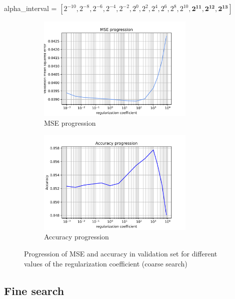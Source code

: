 \documentclass[a4paper]{article}    %
\begin{document}
\begin{center}
    alpha\_interval = $[2^{-10}, 2^{-8}, 2^{-6}, 2^{-4}, 2^{-2}, 2^{0}, 2^{2}, 2^{4}, 2^{6}, 2^{8}, 2^{10}, \boldsymbol{2^{11}, 2^{12}, 2^{13}}]$
\end{center}

\begin{figure}[H]
    \centering
    \begin{subfigure}{0.48\textwidth}
        \centering
        \includegraphics[width=7.5cm]{alpha_MSE_coarse_search}
        \caption{MSE progression}
        \label{fig:alpha-coarse-mse}
    \end{subfigure}
    \hfill
    \begin{subfigure}{0.48\textwidth}
        \centering
        \includegraphics[width=7.5cm]{alpha_ACCURACY_coarse_search}
        \caption{Accuracy progression}
        \label{fig:alpha-coarse-acc}
    \end{subfigure}
    \hfill
    \caption{Progression of MSE and accuracy in validation set for different values of the regularization coefficient (coarse search)}
    \label{fig:alpha_coarse}
\end{figure}

\subsection{Fine search}
\end{document}
